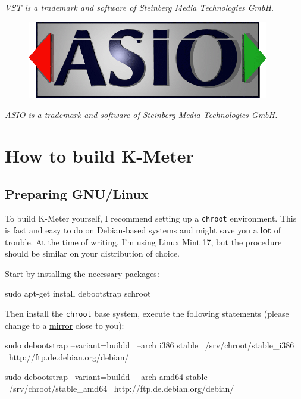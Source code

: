 \emph{VST is a trademark and software of Steinberg Media Technologies
  GmbH.}

\begin{figure}
  \includegraphics[scale=0.60,clip]{include/images/trademark_asio.png}
\end{figure}

\emph{ASIO is a trademark and software of Steinberg Media Technologies
  GmbH.}

\appendix

\chapter{How to build K-Meter}
\label{chap:build_kmeter}

\section{Preparing GNU/Linux}

To build K-Meter yourself, I recommend setting up a \texttt{chroot}
environment.  This is fast and easy to do on Debian-based systems and
might save you a \textbf{lot} of trouble.  At the time of writing, I'm
using Linux Mint 17, but the procedure should be similar on
your distribution of choice.

Start by installing the necessary packages:

\begin{VerbatimBoth}
  sudo apt-get install debootstrap schroot
\end{VerbatimBoth}

Then install the \texttt{chroot} base system, execute the following
statements (please change  to a
\href{http://www.debian.org/mirror/list}{mirror} close to you):

\begin{Verbatim32}
  sudo debootstrap --variant=buildd \
    --arch i386 stable \
    /srv/chroot/stable_i386 \
    http://ftp.de.debian.org/debian/
\end{Verbatim32}

\begin{Verbatim64}
  sudo debootstrap --variant=buildd \
    --arch amd64 stable \
    /srv/chroot/stable_amd64 \
    http://ftp.de.debian.org/debian/
\end{Verbatim64}

